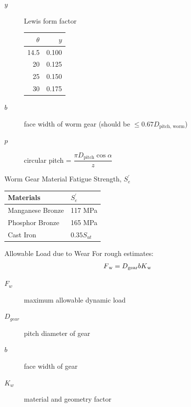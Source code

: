 \documentclass[a4paper,openany]{tufte-book}
\begin{document}
\begin{description}
\item[{\(y\)}] Lewis form factor

\begin{center}
\begin{tabular}{rr}
\(\theta\) & \(y\)\\
\hline
14.5 & 0.100\\
20 & 0.125\\
25 & 0.150\\
30 & 0.175\\
\end{tabular}
\end{center}

\item[{\(b\)}] face width of worm gear (should be
\(\leqslant 0.67D_{\text{pitch, worm}}\))

\item[{\(p\)}] circular pitch =
\(\dfrac{\pi D_{\text{pitch}} \cos \alpha}{z}\)
\end{description}

Worm Gear Material Fatigue Strength, \(S_{e}^{\prime}\)

\begin{center}
\begin{tabular}{ll}
Materials & \(S_{e}^{\prime}\)\\
\hline
Manganese Bronze & 117 MPa\\
Phosphor Bronze & 165 MPa\\
Cast Iron & \(0.35S_{ut}\)\\
\end{tabular}
\end{center}

Allowable Load due to Wear For rough estimates: \begin{align}
    F\textsubscript{w} = D\textsubscript{gear} b K\textsubscript{w}
  \end{align}

\begin{description}
\item[{\(F_{w}\)}] maximum allowable dynamic load

\item[{\(D_{gear}\)}] pitch diameter of gear

\item[{\(b\)}] face width of gear

\item[{\(K_{w}\)}] material and geometry factor
\end{description}
\end{document}
